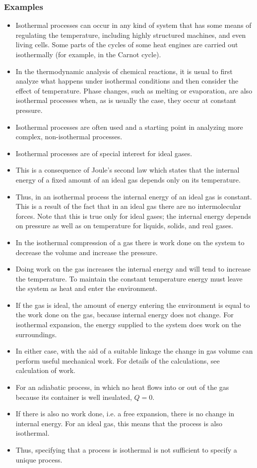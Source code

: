 \documentclass[]{article}
\begin{document}
\subsubsection{Examples}
\begin{itemize}
\item Isothermal processes can occur in any kind of system that has some means of regulating the temperature, including highly structured machines, and even living cells. Some parts of the cycles of some heat engines are carried out isothermally (for example, in the Carnot cycle). 
\item In the thermodynamic analysis of chemical reactions, it is usual to first analyze what happens under isothermal conditions and then consider the effect of temperature. Phase changes, such as melting or evaporation, are also isothermal processes when, as is usually the case, they occur at constant pressure.
\item Isothermal processes are often used and a starting point in analyzing more complex, non-isothermal processes.
\item Isothermal processes are of special interest for ideal gases. 
\item This is a consequence of Joule's second law which states that the internal energy of a fixed amount of an ideal gas depends only on its temperature.	 
\item Thus, in an isothermal process the internal energy of an ideal gas is constant. 
This is a result of the fact that in an ideal gas there are no intermolecular forces. Note that this is true only for ideal gases; the internal energy depends on pressure as well as on temperature for liquids, solids, and real gases.
\item In the isothermal compression of a gas there is work done on the system to decrease the volume and increase the pressure.
\item Doing work on the gas increases the internal energy and will tend to increase the temperature. To maintain the constant temperature energy must leave the system as heat and enter the environment. 
\item If the gas is ideal, the amount of energy entering the environment is equal to the work done on the gas, because internal energy does not change. For isothermal expansion, the energy supplied to the system does work on the surroundings. 
\item In either case, with the aid of a suitable linkage the change in gas volume can perform useful mechanical work. For details of the calculations, see calculation of work.
\item For an adiabatic process, in which no heat flows into or out of the gas because its container is well insulated, $Q = 0. $
\item If there is also no work done, i.e. a free expansion, there is no change in internal energy. For an ideal gas, this means that the process is also isothermal. 
\item Thus, specifying that a process is isothermal is not sufficient to specify a unique process. 
\end{itemize}
\end{document}

